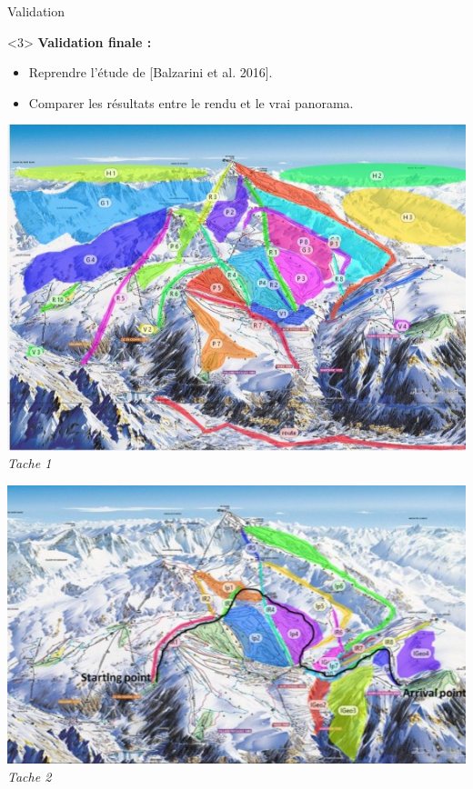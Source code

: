 \documentclass{beamer}
\begin{document}
\begin{frame}[noframenumbering]{Validation}
\begin{onlyenv}
\end{onlyenv}
\begin{onlyenv}<3>
\textbf{Validation finale :} 
\begin{itemize}
\item Reprendre l'étude de [Balzarini et al. 2016].
\item Comparer les résultats entre le rendu et le vrai panorama. 
\end{itemize}
\begin{center}
    \begin{minipage}[c]{0.45\linewidth}
    \begin{center}
    	\includegraphics[width=1.0\linewidth]{Images/Eyetracker_1.png}\\
 		\textit{Tache 1}
    \end{center}
    \end{minipage}
    \hspace{0.2cm}
    \begin{minipage}[c]{0.45\linewidth}
    \begin{center}
    	\includegraphics[width=1.0\linewidth]{Images/Eyetracker_2.png}\\
 		\textit{Tache 2}
    \end{center}
    \end{minipage}

\end{center}
\end{onlyenv}
\end{frame}
\end{document}
